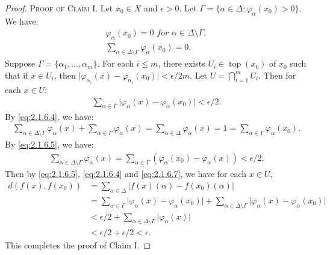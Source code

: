 \documentclass[main.tex]{subfiles}
\begin{document}
\begin{proof}
\noindent\textsc{Proof of Claim I.} Let $x_0 \in X$ and $\epsilon > 0$. 
Let $\Gamma = \{\alpha \in \Delta: \varphi_\alpha(x_0) > 0\}$. We have:
\begin{equation}
 \begin{aligned}
	\varphi_\alpha(x_0) = 0 \textit{ for } \alpha \in\Delta\setminus \Gamma, \\ 
		\sum_{\alpha \in\Delta\setminus \Gamma} \varphi_\alpha(x_0) = 0.  
 \end{aligned}
 \label{eq:2.1.6.4}
\end{equation}
Suppose $\Gamma = \{\alpha_1, \dots, \alpha_m\}$. For each $i \le m$, there 
	exists $U_i\in\operatorname{top}(x_0)$ of $x_0$ such that if $x \in U_i$, 
	then $\vert{}\varphi_{\alpha_i}(x) - \varphi_{\alpha_i}(x_0)\vert{} < \epsilon / 2m$. 
	Let $U = \bigcap_{i=1}^m U_i$. Then for each $x \in U$:
\begin{gather}
		\sum_{\alpha \in \Gamma} \vert{}\varphi_\alpha(x) - \varphi_\alpha(x_0)\vert{} 
		< \epsilon / 2. \label{eq:2.1.6.5}
\end{gather}
	By \eqref{eq:2.1.6.4}, we have:
\begin{gather}
	\sum_{\alpha \in\Delta\setminus \Gamma} \varphi_\alpha(x) + 
		\sum_{\alpha \in \Gamma} \varphi_\alpha(x) = 
		\sum_{\alpha \in \Delta} \varphi_\alpha(x) = 1 = 
		\sum_{\alpha \in \Gamma} \varphi_\alpha(x_0).  \label{eq:2.1.6.6}
\end{gather}
By \eqref{eq:2.1.6.5}, we have:
\begin{gather}
		\sum_{\alpha \in\Delta\setminus  \Gamma} \varphi_\alpha(x) = \sum_{\alpha \in \Gamma} (\varphi_\alpha(x_0) - \varphi_\alpha(x)) < \epsilon / 2. \label{eq:2.1.6.7}
\end{gather}
Then by \eqref{eq:2.1.6.5}, \eqref{eq:2.1.6.4} and \eqref{eq:2.1.6.7}, we have for each $x \in U$,
\begin{equation}
		\begin{aligned}
			d(f(x), f(x_0)) &=\sum_{\alpha \in \Delta} \vert{}f(x)(\alpha) - f(x_0)(\alpha)\vert{} \\
			&= \sum_{\alpha \in \Gamma} \vert{}\varphi_\alpha(x) - \varphi_\alpha(x_0)\vert{} + 
			\sum_{\alpha \in \Delta\setminus \Gamma} \vert{}\varphi_\alpha(x) - \varphi_\alpha(x_0)\vert{}\\
			&< \epsilon/2 + \sum_{\alpha \in \Delta\setminus \Gamma} \vert{}\varphi_\alpha(x)\vert{} \\
			&< \epsilon/2 +\epsilon/2 <\epsilon.
		\end{aligned} \label{eq:2.1.6.8}
\end{equation}
This completes the proof of Claim I.


\end{proof}
\end{document}
